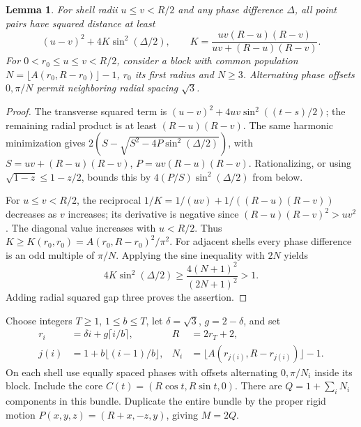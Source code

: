 \documentclass[11pt]{article}
\newtheorem{lemma}[theorem]{Lemma}
\begin{document}
\begin{lemma}\label{cross}
For shell radii $u\le v<R/2$ and any phase difference $\Delta$, all point
pairs have squared distance at least
\[
 (u-v)^2+4K\sin^2(\Delta/2),\qquad
 K=\frac{uv(R-u)(R-v)}{uv+(R-u)(R-v)}.
\]
For $0<r_0\le u\le v<R/2$, consider a block with common population $N=\lfloor A(r_0,R-r_0)\rfloor-1$,
$r_0$ its first radius and $N\ge3$. Alternating phase offsets $0,\pi/N$ permit
neighboring radial spacing $\sqrt3$.
\end{lemma}
\begin{proof}
The transverse squared term is
$(u-v)^2+4uv\sin^2((t-s)/2)$; the remaining radial product is at least
$(R-u)(R-v)$. The same harmonic minimization gives
$2(S-\sqrt{S^2-4P\sin^2(\Delta/2)})$, with
$S=uv+(R-u)(R-v)$, $P=uv(R-u)(R-v)$.
Rationalizing, or using $\sqrt{1-z}\le1-z/2$, bounds this by
$4(P/S)\sin^2(\Delta/2)$ from below.

For $u\le v<R/2$, the reciprocal
$1/K=1/(uv)+1/((R-u)(R-v))$ decreases as $v$ increases;
its derivative is negative since
$(R-u)(R-v)^2>uv^2$. The diagonal value increases with $u<R/2$.
Thus $K\ge K(r_0,r_0)=A(r_0,R-r_0)^2/\pi^2$.
For adjacent shells every phase difference is an odd multiple of $\pi/N$.
Applying the sine inequality with $2N$ yields
\[
4K\sin^2(\Delta/2)\ge\frac{4(N+1)^2}{(2N+1)^2}>1.
\]
Adding radial squared gap three proves the assertion.
\end{proof}

Choose integers $T\ge1$, $1\le b\le T$, let $\delta=\sqrt3$, $g=2-\delta$,
and set
\begin{align}\label{grammar}
r_i&=\delta i+g\lceil i/b\rceil,& R&=2r_T+2,\\
j(i)&=1+b\lfloor(i-1)/b\rfloor,&
N_i&=\lfloor A(r_{j(i)},R-r_{j(i)})\rfloor-1.\nonumber
\end{align}
On each shell use equally spaced phases with offsets alternating $0,\pi/N_i$
inside its block. Include the core $C(t)=(R\cos t,R\sin t,0)$.
There are $Q=1+\sum_iN_i$ components in this bundle. Duplicate the entire
bundle by the proper rigid motion $P(x,y,z)=(R+x,-z,y)$, giving $M=2Q$.
\end{document}
